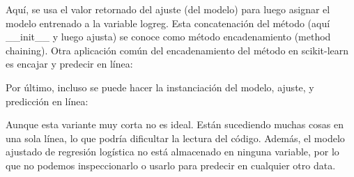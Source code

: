 {{{\begin{minipage}[16cm]{13.5cm}
			{ }
			
			
			Aquí, se usa  el valor  retornado del ajuste (del modelo) para luego asignar el modelo entrenado a la variable logreg. Esta concatenación del método (aquí \_\!\!\_init\_\!\!\_  y luego ajusta) se conoce como  método encadenamiento (method chaining). Otra aplicación común del encadenamiento del método en scikit-learn es encajar y predecir en línea:\\
			
			{}
			
			
			
			Por último, incluso se puede hacer la instanciación del modelo, ajuste, y  predicción en línea:\\ 
			
			
			{}
			
			
			Aunque esta variante muy corta no es ideal. Están sucediendo muchas cosas en una sola línea, lo que podría dificultar la lectura del código. Además, el modelo ajustado de regresión logística no está almacenado en ninguna variable, por lo que no podemos inspeccionarlo o usarlo para predecir en cualquier otro data.			
		\end{minipage} 
}}\\







}
